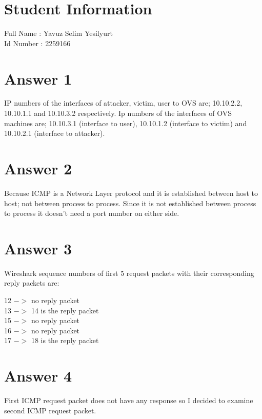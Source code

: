 \documentclass[10pt]{article}
\begin{document}
\section*{Student Information } 
Full Name : Yavuz Selim Yesilyurt \\
Id Number : 2259166 \\

\section*{Answer 1}
\hspace{4mm}	
IP numbers of the interfaces of attacker, victim, user to OVS are; 10.10.2.2, 10.10.1.1 and 10.10.3.2 respectively. Ip numbers of the interfaces of OVS machines are; 10.10.3.1 (interface to user), 10.10.1.2 (interface to victim) and 10.10.2.1 (interface to attacker).

\section*{Answer 2}
\hspace{4mm}	
Because ICMP is a Network Layer protocol and it is established between host to host; not between process to process. Since it is not established between process to process it doesn't need a port number on either side.

\section*{Answer 3}
\hspace{4mm}	
   Wireshark sequence numbers of first 5 request packets with their corresponding reply  packets are: \\
\begin{center}
12 $->$ no reply packet \\
13 $->$ 14 is the reply packet \\
15 $->$ no reply packet \\
16 $->$ no reply packet \\
17 $->$ 18 is the reply packet \\
\end{center}   

\section*{Answer 4}
\hspace{4mm}	
First ICMP request packet does not have any response so I decided to examine second ICMP request packet. \\
\end{document}

